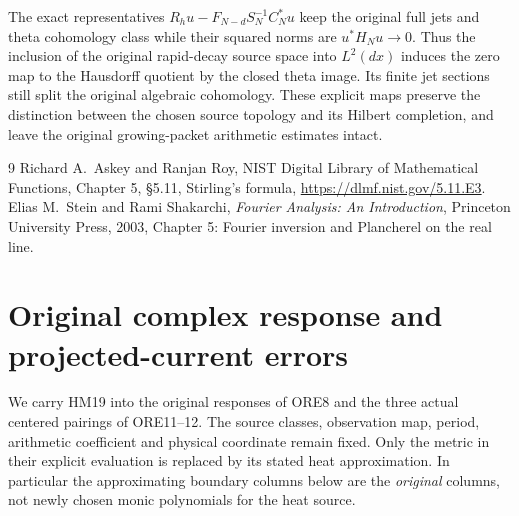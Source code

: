 \documentclass[11pt]{article}
\begin{document}
The exact representatives
$R_hu-F_{N-d}S_N^{-1}C_N^*u$ keep the original full jets and theta
cohomology class while their squared norms are $u^*H_Nu\to0$.
Thus the inclusion of the original rapid-decay source space into
$L^2(dx)$ induces the zero map to the Hausdorff quotient by the
closed theta image. Its finite jet sections still split the original
algebraic cohomology. These explicit maps preserve the distinction
between the chosen source topology and its Hilbert completion, and
leave the original growing-packet arithmetic estimates intact.

\begin{thebibliography}{9}
 Richard A.~Askey and Ranjan Roy,
NIST Digital Library of Mathematical Functions,
Chapter 5, \S5.11, Stirling's formula,
\url{https://dlmf.nist.gov/5.11.E3}.
 Elias M.~Stein and Rami Shakarchi,
\emph{Fourier Analysis: An Introduction}, Princeton University Press,
2003, Chapter 5: Fourier inversion and Plancherel on the real line.
\end{thebibliography}

\endgroup

\clearpage
\begingroup
\def\C{\mathbb C}
\def\norm#1{\left\lVert#1\right\rVert}
\section*{Original complex response and projected-current errors}

We carry HM19 into the original responses of ORE8 and the three actual
centered pairings of ORE11--12. The source classes, observation map,
period, arithmetic coefficient and physical coordinate remain fixed.
Only the metric in their explicit evaluation is replaced by its stated
heat approximation. In particular the approximating boundary columns
below are the \emph{original} columns, not newly chosen monic polynomials
for the heat source.
\end{document}
